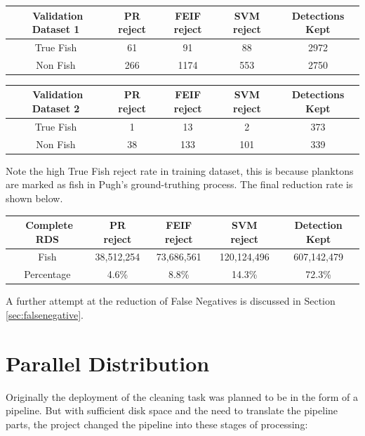 \documentclass[bsc,logo,twoside,fullspacing,parskip]{infthesis}
\begin{document}
\begin{center}
\footnotesize
\begin{tabular}{|c|c|c|c|c|}
\hline 
$ $ Validation Dataset 1 & PR reject & FEIF reject & SVM reject & Detections Kept\\
\hline 
True Fish & 61 & 91 & 88 & 2972 \\
Non Fish & 266 & 1174  & 553 & 2750 \\
\hline 
\end{tabular}
\end{center}

\begin{center}
\footnotesize
\begin{tabular}{|c|c|c|c|c|}
\hline 
$ $ Validation Dataset 2 & PR reject & FEIF reject & SVM reject & Detections Kept\\
\hline 
True Fish & 1 & 13  & 2 & 373 \\
Non Fish & 38 & 133 & 101 & 339 \\
\hline 
\end{tabular}
\end{center}

Note the high True Fish reject rate in training dataset, this is because planktons are marked as fish in Pugh's ground-truthing process. The final reduction rate is shown below.

\begin{center}
\footnotesize
\begin{tabular}{|c|c|c|c|c|}
\hline 
$ $ Complete RDS & PR reject & FEIF reject & SVM reject & Detection Kept\\
\hline 
Fish & 38,512,254 & 73,686,561  & 120,124,496 & 607,142,479 \\
Percentage & 4.6\% & 8.8\% & 14.3\% & 72.3\% \\
\hline 
\end{tabular}
\end{center}

A further attempt at the reduction of False Negatives is discussed in Section \ref{sec:falsenegative}.

\chapter{Parallel Distribution}
\label{chap:parallel}

Originally the deployment of the cleaning task was planned to be in the form of a pipeline.
But with sufficient disk space and the need to translate the pipeline parts, the project changed the pipeline into these stages of processing:
\end{document}
